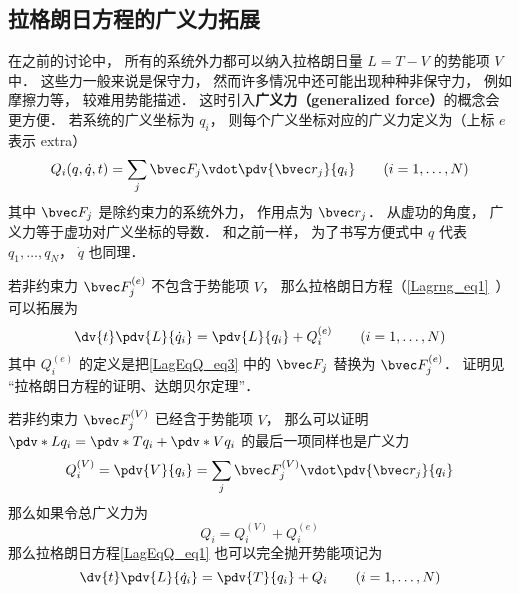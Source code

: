 

\subsection{拉格朗日方程的广义力拓展}
在之前的讨论中， 所有的系统外力都可以纳入拉格朗日量 $L = T-V$ 的势能项 $V$ 中． 这些力一般来说是保守力， 然而许多情况中还可能出现种种非保守力， 例如摩擦力等， 较难用势能描述． 这时引入\textbf{广义力（generalized force）}的概念会更方便． 若系统的广义坐标为 $q_i$， 则每个广义坐标对应的广义力定义为（上标 $e$ 表示 extra）
\begin{equation}\label{LagEqQ_eq3}
Q_i(q, \dot q, t) = \sum_j \bvec F_j \vdot \pdv{\bvec r_j}{q_i} \qquad (i=1,\dots,N)
\end{equation}
其中 $\bvec F_j$ 是除约束力的系统外力， 作用点为 $\bvec r_j$． 从虚功的角度， 广义力等于虚功对广义坐标的导数． 和之前一样， 为了书写方便式中 $q$ 代表 $q_1, \dots, q_N$， $\dot q$ 也同理．

若非约束力 $\bvec F_j^{(e)}$ 不包含于势能项 $V$， 那么拉格朗日方程（\autoref{Lagrng_eq1}~）可以拓展为
\begin{equation}\label{LagEqQ_eq1}
\dv{t} \pdv{L}{\dot q_i} = \pdv{L}{q_i} + Q_i^{(e)}
\qquad (i=1,\dots,N)
\end{equation}
其中 $Q_i^{(e)}$ 的定义是把\autoref{LagEqQ_eq3} 中的 $\bvec F_j$ 替换为 $\bvec F_j^{(e)}$． 证明见 “拉格朗日方程的证明、达朗贝尔定理”．

若非约束力 $\bvec F_j^{(V)}$ 已经含于势能项 $V$， 那么可以证明 $\pdv*{L}{q_i} = \pdv*{T}{q_i} + \pdv*{V}{q_i}$ 的最后一项同样也是广义力
\begin{equation}
Q_i^{(V)} = \pdv{V}{q_i} = \sum_j \bvec F_j^{(V)} \vdot \pdv{\bvec r_j}{q_i}
\end{equation}
那么如果令总广义力为
\begin{equation}
Q_i = Q_i^{(V)} + Q_i^{(e)}
\end{equation}
那么拉格朗日方程\autoref{LagEqQ_eq1} 也可以完全抛开势能项记为
\begin{equation}\label{LagEqQ_eq2}
\dv{t} \pdv{L}{\dot q_i} = \pdv{T}{q_i} + Q_i
\qquad (i=1,\dots,N)
\end{equation}


